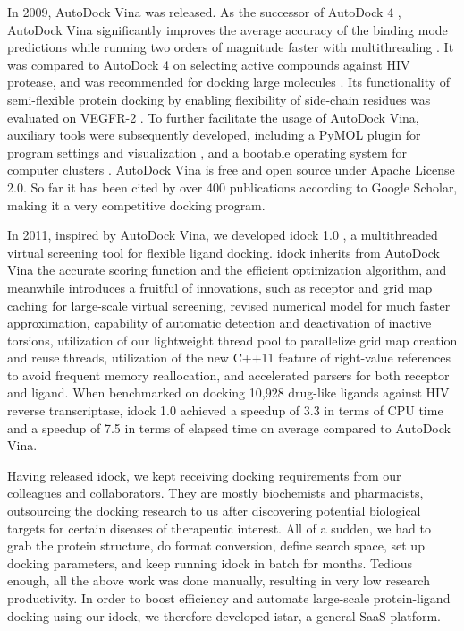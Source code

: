 \documentclass[12pt]{article}
\begin{document}
In 2009, AutoDock Vina \citep{595} was released. As the successor of AutoDock 4 \citep{596}, AutoDock Vina significantly improves the average accuracy of the binding mode predictions while running two orders of magnitude faster with multithreading \citep{595}. It was compared to AutoDock 4 on selecting active compounds against HIV protease, and was recommended for docking large molecules \citep{556}. Its functionality of semi-flexible protein docking by enabling flexibility of side-chain residues was evaluated on VEGFR-2 \citep{1084}. To further facilitate the usage of AutoDock Vina, auxiliary tools were subsequently developed, including a PyMOL plugin for program settings and visualization \citep{609}, and a bootable operating system for computer clusters \citep{773}. AutoDock Vina is free and open source under Apache License 2.0. So far it has been cited by over 400 publications according to Google Scholar, making it a very competitive docking program.

In 2011, inspired by AutoDock Vina, we developed idock 1.0 \citep{1153}, a multithreaded virtual screening tool for flexible ligand docking. idock inherits from AutoDock Vina the accurate scoring function and the efficient optimization algorithm, and meanwhile introduces a fruitful of innovations, such as receptor and grid map caching for large-scale virtual screening, revised numerical model for much faster approximation, capability of automatic detection and deactivation of inactive torsions, utilization of our lightweight thread pool to parallelize grid map creation and reuse threads, utilization of the new C++11 feature of right-value references to avoid frequent memory reallocation, and accelerated parsers for both receptor and ligand. When benchmarked on docking 10,928 drug-like ligands against HIV reverse transcriptase, idock 1.0 achieved a speedup of 3.3 in terms of CPU time and a speedup of 7.5 in terms of elapsed time on average compared to AutoDock Vina.

Having released idock, we kept receiving docking requirements from our colleagues and collaborators. They are mostly biochemists and pharmacists, outsourcing the docking research to us after discovering potential biological targets for certain diseases of therapeutic interest. All of a sudden, we had to grab the protein structure, do format conversion, define search space, set up docking parameters, and keep running idock in batch for months. Tedious enough, all the above work was done manually, resulting in very low research productivity. In order to boost efficiency and automate large-scale protein-ligand docking using our idock, we therefore developed istar, a general SaaS platform.
\end{document}
